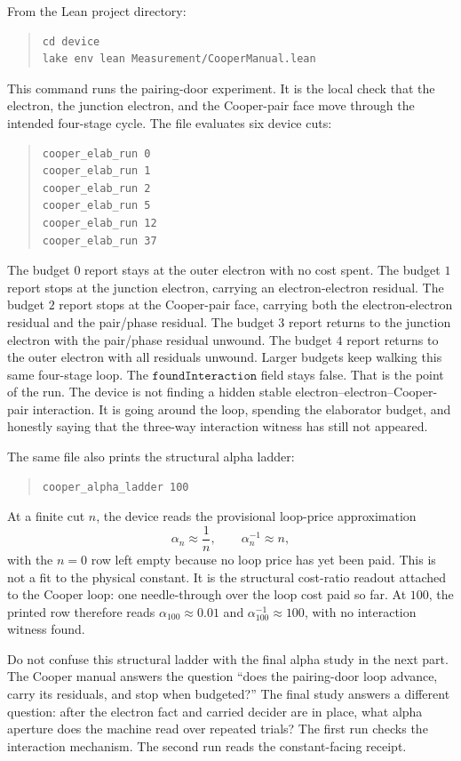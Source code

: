 From the Lean project directory:

\begin{quote}\small
\begin{verbatim}
cd device
lake env lean Measurement/CooperManual.lean
\end{verbatim}
\end{quote}

This command runs the pairing-door experiment. It is the local check that the electron, the junction electron,
and the Cooper-pair face move through the intended four-stage cycle. The file evaluates six device cuts:

\begin{quote}\small
\begin{verbatim}
cooper_elab_run 0
cooper_elab_run 1
cooper_elab_run 2
cooper_elab_run 5
cooper_elab_run 12
cooper_elab_run 37
\end{verbatim}
\end{quote}

The budget \(0\) report stays at the outer electron with no cost spent. The budget \(1\) report stops at the
junction electron, carrying an electron-electron residual. The budget \(2\) report stops at the Cooper-pair face,
carrying both the electron-electron residual and the pair/phase residual. The budget \(3\) report returns to the
junction electron with the pair/phase residual unwound. The budget \(4\) report returns to the outer electron
with all residuals unwound. Larger budgets keep walking this same four-stage loop. The
\(\texttt{foundInteraction}\) field stays false. That is the point of the run. The device is not finding a hidden
stable electron--electron--Cooper-pair interaction. It is going around the loop, spending the elaborator budget,
and honestly saying that the three-way interaction witness has still not appeared.

The same file also prints the structural alpha ladder:

\begin{quote}\small
\begin{verbatim}
cooper_alpha_ladder 100
\end{verbatim}
\end{quote}

At a finite cut \(n\), the device reads the provisional loop-price approximation
\[
  \alpha_n \approx \frac{1}{n},
  \qquad
  \alpha_n^{-1} \approx n ,
\]
with the \(n=0\) row left empty because no loop price has yet been paid. This is not a fit to the physical
constant. It is the structural cost-ratio readout attached to the Cooper loop: one needle-through over the loop
cost paid so far. At \(100\), the printed row therefore reads \(\alpha_{100}\approx 0.01\) and
\(\alpha_{100}^{-1}\approx 100\), with no interaction witness found.

Do not confuse this structural ladder with the final alpha study in the next part. The Cooper manual answers the
question ``does the pairing-door loop advance, carry its residuals, and stop when budgeted?'' The final study
answers a different question: after the electron fact and carried decider are in place, what alpha aperture does
the machine read over repeated trials? The first run checks the interaction mechanism. The second run reads the
constant-facing receipt.
